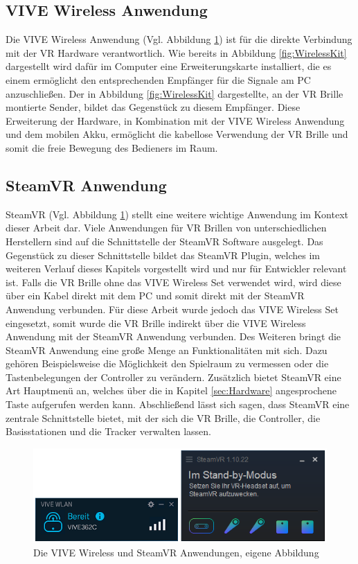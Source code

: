 \subsection{VIVE Wireless Anwendung}\label{sec:VIVEWireless}
Die VIVE Wireless Anwendung (Vgl. Abbildung \ref{fig:VIVEWirelessSteamVR}) ist für die direkte Verbindung mit der VR Hardware verantwortlich. Wie bereits in Abbildung \ref{fig:WirelessKit} dargestellt wird dafür im Computer eine Erweiterungskarte installiert, die es einem ermöglicht den entsprechenden Empfänger für die Signale am PC anzuschließen. Der in Abbildung \ref{fig:WirelessKit} dargestellte, an der VR Brille montierte Sender, bildet das Gegenstück zu diesem Empfänger. Diese Erweiterung der Hardware, in Kombination mit der VIVE Wireless Anwendung und dem mobilen Akku, ermöglicht die kabellose Verwendung der VR Brille und somit die freie Bewegung des Bedieners im Raum.

\subsection{SteamVR Anwendung}\label{sec:SteamVR}
SteamVR (Vgl. Abbildung \ref{fig:VIVEWirelessSteamVR}) stellt eine weitere wichtige Anwendung im Kontext dieser Arbeit dar. Viele Anwendungen für VR Brillen von unterschiedlichen Herstellern sind auf die Schnittstelle der SteamVR Software ausgelegt. Das Gegenstück zu dieser Schnittstelle bildet das SteamVR Plugin, welches im weiteren Verlauf dieses Kapitels vorgestellt wird und nur für Entwickler relevant ist. Falls die VR Brille ohne das VIVE Wireless Set verwendet wird, wird diese über ein Kabel direkt mit dem PC und somit direkt mit der SteamVR Anwendung verbunden. Für diese Arbeit wurde jedoch das VIVE Wireless Set eingesetzt, somit wurde die VR Brille indirekt über die VIVE Wireless Anwendung mit der SteamVR Anwendung verbunden. Des Weiteren bringt die SteamVR Anwendung eine große Menge an Funktionalitäten mit sich. Dazu gehören Beispielsweise die Möglichkeit den Spielraum zu vermessen oder die Tastenbelegungen der Controller zu verändern. Zusätzlich bietet SteamVR eine Art Hauptmenü an, welches über die in Kapitel \ref{sec:Hardware} angesprochene Taste aufgerufen werden kann. Abschließend lässt sich sagen, dass SteamVR eine zentrale Schnittstelle bietet, mit der sich die VR Brille, die Controller, die Basisstationen und die Tracker verwalten lassen.
\begin{figure}[h]
	\centering
	\includegraphics[width=0.8\linewidth]{Bilder/A33_VIVESteam}
	\caption{Die VIVE Wireless und SteamVR Anwendungen, eigene Abbildung}
	\label{fig:VIVEWirelessSteamVR}
\end{figure}

